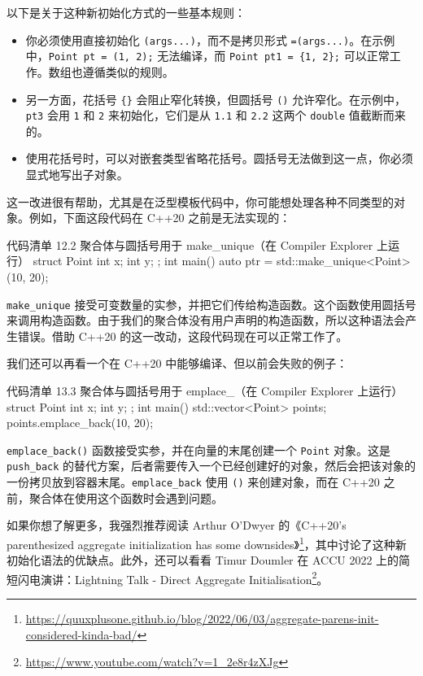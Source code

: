 以下是关于这种新初始化方式的一些基本规则：

\begin{itemize}
\item 你必须使用直接初始化 \texttt{(args...)}，而不是拷贝形式 \texttt{=(args...)}。在示例中，\texttt{Point pt = (1, 2);} 无法编译，而 \texttt{Point pt1 = \{1, 2\};} 可以正常工作。数组也遵循类似的规则。
\item 另一方面，花括号 \texttt{\{\}} 会阻止窄化转换，但圆括号 \texttt{()} 允许窄化。在示例中，\texttt{pt3} 会用 \texttt{1} 和 \texttt{2} 来初始化，它们是从 \texttt{1.1} 和 \texttt{2.2} 这两个 \texttt{double} 值截断而来的。
\item 使用花括号时，可以对嵌套类型省略花括号。圆括号无法做到这一点，你必须显式地写出子对象。
\end{itemize}

这一改进很有帮助，尤其是在泛型模板代码中，你可能想处理各种不同类型的对象。例如，下面这段代码在 C++20 之前是无法实现的：

\begin{codeboxt}[cpp]{代码清单 12.2 聚合体与圆括号用于 make\_unique（在 Compiler Explorer 上运行）}
struct Point { int x; int y; };
int main() {
auto ptr = std::make_unique<Point>(10, 20);
}
\end{codeboxt}

\texttt{make\_unique} 接受可变数量的实参，并把它们传给构造函数。这个函数使用圆括号来调用构造函数。由于我们的聚合体没有用户声明的构造函数，所以这种语法会产生错误。借助 C++20 的这一改动，这段代码现在可以正常工作了。

我们还可以再看一个在 C++20 中能够编译、但以前会失败的例子：

\begin{codeboxt}[cpp]{代码清单 13.3 聚合体与圆括号用于 emplace\_（在 Compiler Explorer 上运行）}
struct Point { int x; int y; };
int main() {
std::vector<Point> points;
points.emplace_back(10, 20);
}
\end{codeboxt}

\texttt{emplace\_back()} 函数接受实参，并在向量的末尾创建一个 \texttt{Point} 对象。这是 \texttt{push\_back} 的替代方案，后者需要传入一个已经创建好的对象，然后会把该对象的一份拷贝放到容器末尾。\texttt{emplace\_back} 使用 \texttt{()} 来创建对象，而在 C++20 之前，聚合体在使用这个函数时会遇到问题。

如果你想了解更多，我强烈推荐阅读 Arthur O'Dwyer 的《C++20's parenthesized aggregate initialization has some downsides》\footnote{\url{https://quuxplusone.github.io/blog/2022/06/03/aggregate-parens-init-considered-kinda-bad/}}，其中讨论了这种新初始化语法的优缺点。此外，还可以看看 Timur Doumler 在 ACCU 2022 上的简短闪电演讲：Lightning Talk - Direct Aggregate Initialisation\footnote{\url{https://www.youtube.com/watch?v=1_2e8r4zXJg}}。

